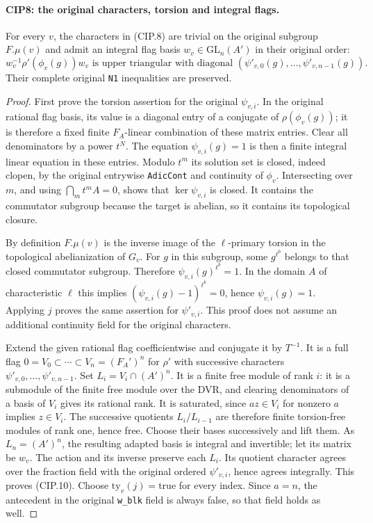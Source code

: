 \paragraph{CIP8: the original characters, torsion and integral flags.}
\label{claim:CIP8}
For every $v$, the characters in (CIP.8) are trivial on the
original subgroup $F.\mu(v)$ and admit an integral flag basis
$w_v\in\mathrm{GL}_n(A')$ in their original order:
\[
 w_v^{-1}\rho'(\phi_v(g))w_v
 \text{ is upper triangular with diagonal }
 (\psi'_{v,0}(g),\ldots,\psi'_{v,n-1}(g)).           \tag{CIP.10}
\]
Their complete original \texttt{N1} inequalities are preserved.
\begin{proof}
First prove the torsion assertion for the original $\psi_{v,i}$.
In the original rational flag basis, its value is a diagonal
entry of a conjugate of $\rho(\phi_v(g))$; it is therefore a
fixed finite $F_A$-linear combination of these matrix entries.
Clear all denominators by a power $t^N$.  The equation
$\psi_{v,i}(g)=1$ is then a finite integral linear equation in
these entries.  Modulo $t^m$ its solution set is closed, indeed
clopen, by the original entrywise \texttt{AdicCont} and
continuity of $\phi_v$.  Intersecting over $m$, and using
$\bigcap_m t^mA=0$, shows that $\ker\psi_{v,i}$ is closed.
It contains the commutator subgroup because the target is abelian,
so it contains its topological closure.

By definition $F.\mu(v)$ is the inverse image of the
$\ell$-primary torsion in the topological abelianization of $G_v$.
For $g$ in this subgroup, some $g^{\ell^b}$ belongs to that closed
commutator subgroup.  Therefore $\psi_{v,i}(g)^{\ell^b}=1$.
In the domain $A$ of characteristic $\ell$ this implies
$(\psi_{v,i}(g)-1)^{\ell^b}=0$, hence
$\psi_{v,i}(g)=1$.  Applying $j$ proves the same assertion for
$\psi'_{v,i}$.  This proof does not assume an additional continuity
field for the original characters.

Extend the given rational flag coefficientwise and conjugate it
by $T^{-1}$.  It is a full flag
$0=V_0\subset\cdots\subset V_n=(F_A')^n$ for $\rho'$ with
successive characters $\psi'_{v,0},\ldots,\psi'_{v,n-1}$.
Set $L_i=V_i\cap(A')^n$.  It is a finite free module of rank $i$:
it is a submodule of the finite free module over the DVR, and
clearing denominators of a basis of $V_i$ gives its rational rank.
It is saturated, since $az\in V_i$ for nonzero $a$ implies
$z\in V_i$.  The successive quotients $L_i/L_{i-1}$ are therefore
finite torsion-free modules of rank one, hence free.  Choose their
bases successively and lift them.  As $L_n=(A')^n$, the resulting
adapted basis is integral and invertible; let its matrix be $w_v$.
The action and its inverse preserve each $L_i$.  Its quotient
character agrees over the fraction field with the original ordered
$\psi'_{v,i}$, hence agrees integrally.  This proves (CIP.10).
Choose $\mathrm{ty}_v(j)=\mathrm{true}$ for every index.  Since
$a=n$, the antecedent in the original \texttt{w\_blk} field is
always false, so that field holds as well.


\end{proof}
